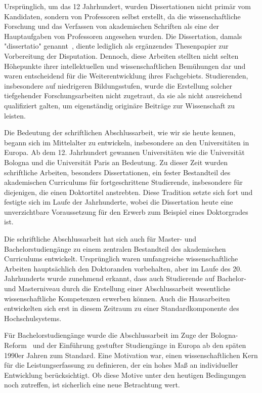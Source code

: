 \documentclass[conference]{IEEEtran}
\begin{document}
Ursprünglich, um das 12 Jahrhundert, wurden Dissertationen nicht primär vom Kandidaten, sondern von Professoren selbst erstellt, da die wissenschaftliche Forschung und das Verfassen von akademischen Schriften als eine der Hauptaufgaben von Professoren angesehen wurden. Die Dissertation, damals "dissertatio" genannt~\cite{Blair}, diente lediglich als ergänzendes Thesenpapier zur Vorbereitung der Disputation. Dennoch, diese Arbeiten stellten nicht selten Höhepunkte ihrer intellektuellen und wissenschaftlichen Bemühungen dar und waren entscheidend für die Weiterentwicklung ihres Fachgebiets. Studierenden, insbesondere auf niedrigeren Bildungsstufen, wurde die Erstellung solcher tiefgehender Forschungsarbeiten nicht zugetraut, da sie als nicht ausreichend qualifiziert galten, um eigenständig originäre Beiträge zur Wissenschaft zu leisten.~\cite{Schmidt-Kunsemuller1979-vd}

Die Bedeutung der schriftlichen Abschlussarbeit, wie wir sie heute kennen, begann sich im Mittelalter zu entwickeln, insbesondere an den Universitäten in Europa. Ab dem 12. Jahrhundert gewannen Universitäten wie die Universität Bologna und die Universität Paris an Bedeutung. Zu dieser Zeit wurden schriftliche Arbeiten, besonders Dissertationen, ein fester Bestandteil des akademischen Curriculums für fortgeschrittene Studierende, insbesondere für diejenigen, die einen Doktortitel anstrebten. Diese Tradition setzte sich fort und festigte sich im Laufe der Jahrhunderte, wobei die Dissertation heute eine unverzichtbare Voraussetzung für den Erwerb zum Beispiel eines Doktorgrades ist.~\cite{hps_medieval_universities}

Die schriftliche Abschlussarbeit hat sich auch für Master- und Bachelorstudiengänge zu einem zentralen Bestandteil des akademischen Curriculums entwickelt. Ursprünglich waren umfangreiche wissenschaftliche Arbeiten hauptsächlich den Doktoranden vorbehalten, aber im Laufe des 20. Jahrhunderts wurde zunehmend erkannt, dass auch Studierende auf Bachelor- und Masterniveau durch die Erstellung einer Abschlussarbeit wesentliche wissenschaftliche Kompetenzen erwerben können. Auch die Hausarbeiten entwickelten sich erst in diesem Zeitraum zu einer Standardkomponente des Hochschulsystems.

Für Bachelorstudiengänge wurde die Abschlussarbeit im Zuge der Bologna-Reform~\cite{terry2008bologna} und der Einführung gestufter Studiengänge in Europa ab den späten 1990er Jahren zum Standard. Eine Motivation war, einen wissenschaftlichen Kern für die Leistungserfassung zu definieren, der ein hohes Maß an individueller Entwicklung berücksichtigt. Ob diese Motive unter den heutigen Bedingungen noch zutreffen, ist sicherlich eine neue Betrachtung wert. 
\end{document}
